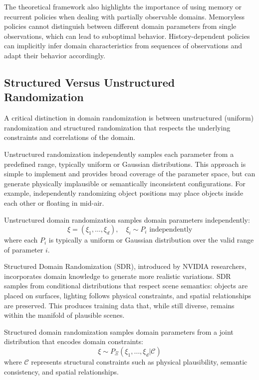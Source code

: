 The theoretical framework also highlights the importance of using memory or recurrent policies when dealing with partially observable domains. Memoryless policies cannot distinguish between different domain parameters from single observations, which can lead to suboptimal behavior. History-dependent policies can implicitly infer domain characteristics from sequences of observations and adapt their behavior accordingly.

\subsection{Structured Versus Unstructured Randomization}
\label{subsec:structured_unstructured}

A critical distinction in domain randomization is between unstructured (uniform) randomization and structured randomization that respects the underlying constraints and correlations of the domain.

Unstructured randomization independently samples each parameter from a predefined range, typically uniform or Gaussian distributions. This approach is simple to implement and provides broad coverage of the parameter space, but can generate physically implausible or semantically inconsistent configurations. For example, independently randomizing object positions may place objects inside each other or floating in mid-air.

\begin{definition}
\label{def:unstructured_dr}
Unstructured domain randomization samples domain parameters independently:
\begin{equation}
\xi = (\xi_1, \ldots, \xi_d), \quad \xi_i \sim P_i \text{ independently}
\end{equation}
where each $P_i$ is typically a uniform or Gaussian distribution over the valid range of parameter $i$.
\end{definition}

Structured Domain Randomization (SDR), introduced by NVIDIA researchers, incorporates domain knowledge to generate more realistic variations. SDR samples from conditional distributions that respect scene semantics: objects are placed on surfaces, lighting follows physical constraints, and spatial relationships are preserved. This produces training data that, while still diverse, remains within the manifold of plausible scenes.

\begin{definition}
\label{def:structured_dr}
Structured domain randomization samples domain parameters from a joint distribution that encodes domain constraints:
\begin{equation}
\xi \sim P_\Xi(\xi_1, \ldots, \xi_d | \mathcal{C})
\end{equation}
where $\mathcal{C}$ represents structural constraints such as physical plausibility, semantic consistency, and spatial relationships.
\end{definition}


